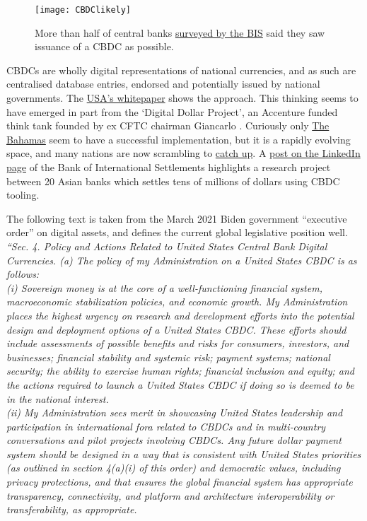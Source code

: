 \begin{itemize}
\begin{figure}
  \centering
    \texttt{[image: CBDClikely]}
  \caption{More than half of central banks \href{https://www.bis.org/publ/bppdf/bispap125.htm}{surveyed by the BIS} said they saw issuance of a CBDC as possible.}
  \label{fig:CBDClikely}
\end{figure}
CBDCs are wholly digital representations of national currencies, and as such are centralised database entries, endorsed and potentially issued by national governments. The \href{https://www.federalreserve.gov/publications/files/money-and-payments-20220120.pdf}{USA's whitepaper} shows the approach. This thinking seems to have emerged in part from the `Digital Dollar Project', an Accenture funded think tank founded by ex CFTC chairman Giancarlo \cite{giancarlo2021cryptodad}. Curiously only \href{https://www.sanddollar.bs/about}{The Bahamas} seem to have a successful implementation, but it is a rapidly evolving space, and many nations are now scrambling to \href{https://twitter.com/GobiernoMX/status/1476376240873517061}{catch up}. A \href{https://www.linkedin.com/feed/update/urn:li:activity:6980330210030145536/}{post on the LinkedIn page} of the Bank of International Settlements highlights a research project between 20 Asian banks which settles tens of millions of dollars using CBDC tooling.\par
The following text is taken from the March 2021 Biden government ``executive order'' on digital assets, and defines the current global legislative position well.\\
\textit{``Sec. 4.  Policy and Actions Related to United States Central Bank Digital Currencies.  (a)  The policy of my Administration on a United States CBDC is as follows:\\
(i) Sovereign money is at the core of a well-functioning financial system, macroeconomic stabilization policies, and economic growth.  My Administration places the highest urgency on research and development efforts into the potential design and deployment options of a United States CBDC.  These efforts should include assessments of possible benefits and risks for consumers, investors, and businesses; financial stability and systemic risk; payment systems; national security; the ability to exercise human rights; financial inclusion and equity; and the actions required to launch a United States CBDC if doing so is deemed to be in the national interest.\\
(ii)   My Administration sees merit in showcasing United States leadership and participation in international fora related to CBDCs and in multi‑country conversations and pilot projects involving CBDCs.  Any future dollar payment system should be designed in a way that is consistent with United States priorities (as outlined in section 4(a)(i) of this order) and democratic values, including privacy protections, and that ensures the global financial system has appropriate transparency, connectivity, and platform and architecture interoperability or transferability, as appropriate.\\
}
\end{itemize}
